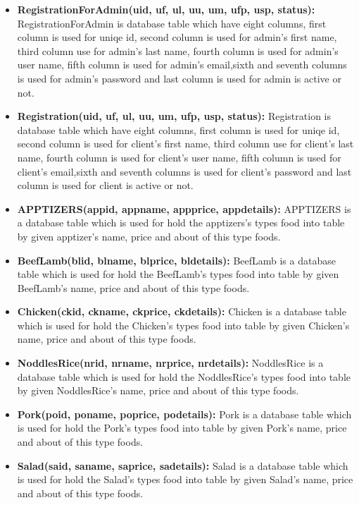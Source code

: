 \documentclass[12pt,a4paper]{article}
\begin{document}
		\begin{itemize}
			\item \textbf{RegistrationForAdmin(uid, uf, ul, uu, um, ufp, usp, status):} RegistrationForAdmin is database table which have eight columns, first column is used for uniqe id, second column is used for admin's first name, third column use for admin's last name, fourth column is used for admin's user name, fifth column is used for admin's email,sixth and seventh columns is used for admin's password and last column is used for admin is active or not. 
			\item \textbf{Registration(uid, uf, ul, uu, um, ufp, usp, status):} Registration is database table which have eight columns, first column is used for uniqe id, second column is used for client's first name, third column use for client's last name, fourth column is used for client's user name, fifth column is used for client's email,sixth and seventh columns is used for client's password and last column is used for client is active or not. 
			\item \textbf{APPTIZERS(appid, appname, appprice, appdetails):} APPTIZERS is a database table which is used for hold the apptizers's types food into table by given apptizer's name, price and about of this type foods.
			\item \textbf{BeefLamb(blid, blname, blprice, bldetails):} BeefLamb is a database table which is used for hold the BeefLamb's types food into table by given BeefLamb's name, price and about of this type foods.
			\item \textbf{Chicken(ckid, ckname, ckprice, ckdetails):} Chicken is a database table which is used for hold the Chicken's types food into table by given Chicken's name, price and about of this type foods.
			\item \textbf{NoddlesRice(nrid, nrname, nrprice, nrdetails):} NoddlesRice is a database table which is used for hold the NoddlesRice's types food into table by given NoddlesRice's name, price and about of this type foods.
			\item \textbf{Pork(poid, poname, poprice, podetails):} Pork is a database table which is used for hold the Pork's types food into table by given Pork's name, price and about of this type foods.
			\item \textbf{Salad(said, saname, saprice, sadetails):} Salad is a database table which is used for hold the Salad's types food into table by given Salad's name, price and about of this type foods.

\end{itemize}
\end{document}
